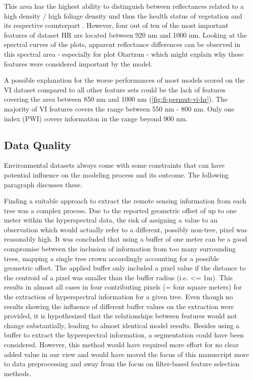 \documentclass[peerreview]{IEEEtran}
\begin{document}
This area has the highest ability to distinguish between reflectances related to a high density / high foliage density und thus the health status of vegetation and its respective counterpart \cite{horler1983}.
However, four out of ten of the most important features of dataset HR are located between 920 nm and 1000 nm.
Looking at the spectral curves of the plots, apparent reflectance differences can be observed in this spectral area - especially for plot Oiartzun - which might explain why these features were considered important by the model.

A possible explanation for the worse performances of most models scored on the VI dataset compared to all other feature sets could be the lack of features covering the area between 850 nm and 1000 nm (\autoref{fig:fi-permut-vi-hr}).
The majority of VI features covers the range between 550 nm - 800 nm.
Only one index (PWI) covers information in the range beyond 900 nm.

\subsection{Data Quality}
\label{subsec:data-quality}

Environmental datasets always come with some constraints that can have potential influence on the modeling process and its outcome.
The following paragraph discusses these.

Finding a suitable approach to extract the remote sensing information from each tree was a complex process.
Due to the reported geometric offset of up to one meter within the hyperspectral data, the risk of assigning a value to an observation which would actually refer to a different, possibly non-tree, pixel was reasonably high.
It was concluded that using a buffer of one meter can be a good compromise between the inclusion of information from too many surrounding trees, mapping a single tree crown accordingly accounting for a possible geometric offset.
The applied buffer only included a pixel value if the distance to the centroid of a pixel was smaller than the buffer radius (i.e. <= 1m).
This results in almost all cases in four contributing pixels (= four square meters) for the extraction of hyperspectral information for a given tree.
Even though no results showing the influence of different buffer values on the extraction were provided, it is hypothesized that the relationships between features would not change substantially, leading to almost identical model results.
Besides using a buffer to extract the hyperspectral information, a segmentation could have been considered.
However, this method would have required more effort for no clear added value in our view and would have moved the focus of this manuscript more to data preprocessing and away from the focus on filter-based feature selection methods.
\end{document}
